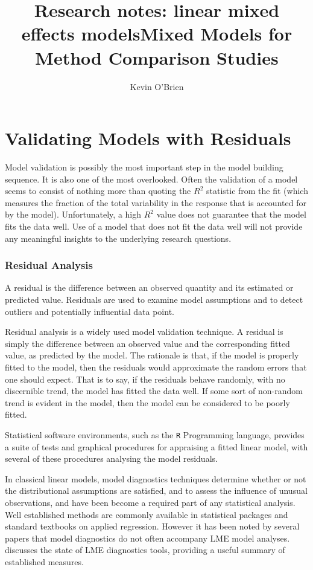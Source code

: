 \documentclass[12pt, a4paper]{report}
\title{Research notes: linear mixed effects models}
\author{ } \date{ }
\theoremstyle{plain}
\theoremstyle{definition}
\theoremstyle{remark}
\begin{document}
	\author{Kevin O'Brien}
	\title{Mixed Models for Method Comparison Studies}
	\tableofcontents
	

	
\section{Validating Models with Residuals}
Model validation is possibly the most important step in the model building sequence. It is also one of the most overlooked. Often the validation of a model seems to consist of nothing more than quoting the $R^2$ statistic from the fit (which measures the fraction of the total variability in the response that is accounted for by the model). Unfortunately, a high $R^2$ value does not guarantee that the model fits the data well. Use of a model that does not fit the data well will not provide any meaningful insights to the underlying research questions.
	
\subsubsection{Residual Analysis}
A residual is the difference between an observed quantity and its estimated or predicted value. Residuals are used to examine model assumptions and to detect outliers and potentially influential data	point. 
	
Residual analysis is a widely used model validation technique. A residual is simply the difference between an observed value and the corresponding fitted value, as predicted by the model. The rationale is that, if the model is properly fitted to the model, then the residuals would approximate the random errors that one should expect. That is to say, if the residuals behave randomly, with no discernible trend, the model has fitted the data well. If some sort of non-random trend is evident in the model, then the model can be considered to be poorly fitted.
		
Statistical software environments, such as the \texttt{R} Programming language, provides a suite of tests and graphical procedures for appraising a fitted linear model, with several of these procedures analysing the model residuals.
			
In classical linear models, model diagnostics techniques determine whether or not the distributional assumptions are satisfied, and to assess the influence of unusual observations, and have been become a required part of any statistical analysis. Well established methods are commonly available in statistical packages and standard textbooks on applied regression. However it has been noted by several papers that model diagnostics do not often accompany LME model analyses. \citet{schabenberger} discusses the state of LME diagnostics tools, providing a useful summary of established measures.
			
\end{document}
